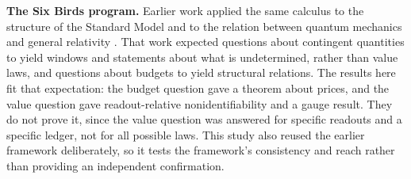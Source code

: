 \textbf{The Six Birds program.} Earlier work applied the same calculus
to the structure of the Standard Model and to the relation between
quantum mechanics and general relativity \citep{TsiokosSixBirds2026}.
That work expected questions about contingent quantities to yield
windows and statements about what is undetermined, rather than value
laws, and questions about budgets to yield structural relations. The
results here fit that expectation: the budget question gave a theorem
about prices, and the value question gave readout-relative
nonidentifiability and a gauge result. They do not prove it, since the
value question was answered for specific readouts and a specific ledger,
not for all possible laws. This study also reused the earlier framework
deliberately, so it tests the framework's consistency and reach rather
than providing an independent confirmation.
